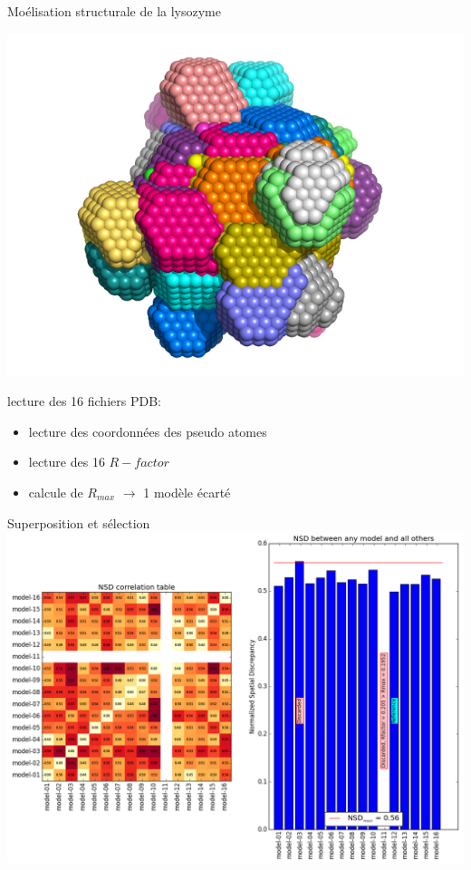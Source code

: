 \documentclass{beamer}
\begin{document}
\begin{frame}{Mo\'elisation structurale de la lysozyme}
\begin{minipage}{0.40\linewidth}
    \begin{flushleft}
    \includegraphics[scale=0.2]{unalignedmodels.png}
    \end{flushleft}
\end{minipage} \hfill
\begin{minipage}{0.55\linewidth}
lecture des 16 fichiers PDB:
\begin{itemize}
  \item lecture des coordonn\'ees des pseudo atomes
  \item lecture des 16 $R-factor$ 
  \item calcule de $R_{max}$ $\rightarrow$ 1 mod\`ele \'ecart\'e
\end{itemize}
\end{minipage}
\end{frame}

\begin{frame}{Superposition et s\'election}
\includegraphics[scale=0.30]{nsd.png}
\end{frame}
\end{document}
